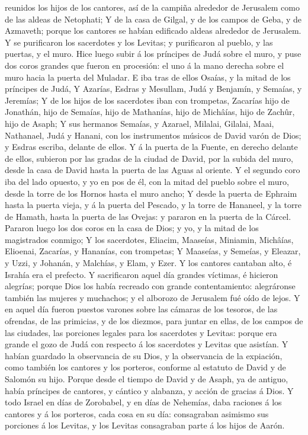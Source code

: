 reunidos los hijos de los cantores, así de la campiña alrededor de
Jerusalem como de las aldeas de Netophati;  Y de la casa
de Gilgal, y de los campos de Geba, y de Azmaveth; porque los cantores
se habían edificado aldeas alrededor de Jerusalem.  Y se
purificaron los sacerdotes y los Levitas; y purificaron al pueblo, y las
puertas, y el muro.  Hice luego subir á los príncipes de
Judá sobre el muro, y puse dos coros grandes que fueron en procesión: el
uno á la mano derecha sobre el muro hacia la puerta del Muladar.
 E iba tras de ellos Osaías, y la mitad de los príncipes
de Judá,  Y Azarías, Esdras y Mesullam, 
Judá y Benjamín, y Semaías, y Jeremías;  Y de los hijos
de los sacerdotes iban con trompetas, Zacarías hijo de Jonathán, hijo de
Semaías, hijo de Mathanías, hijo de Michâías, hijo de Zachûr, hijo de
Asaph;  Y sus hermanos Semaías, y Azarael, Milalai,
Gilalai, Maai, Nathanael, Judá y Hanani, con los instrumentos músicos de
David varón de Dios; y Esdras escriba, delante de ellos. 
Y á la puerta de la Fuente, en derecho delante de ellos, subieron por
las gradas de la ciudad de David, por la subida del muro, desde la casa
de David hasta la puerta de las Aguas al oriente.  Y el
segundo coro iba del lado opuesto, y yo en pos de él, con la mitad del
pueblo sobre el muro, desde la torre de los Hornos hasta el muro ancho;
 Y desde la puerta de Ephraim hasta la puerta vieja, y á
la puerta del Pescado, y la torre de Hananeel, y la torre de Hamath,
hasta la puerta de las Ovejas: y pararon en la puerta de la Cárcel.
 Pararon luego los dos coros en la casa de Dios; y yo, y
la mitad de los magistrados conmigo;  Y los sacerdotes,
Eliacim, Maaseías, Miniamin, Michâías, Elioenai, Zacarías, y Hananías,
con trompetas;  Y Maaseías, y Semeías, y Eleazar, y Uzzi,
y Johanán, y Malchías, y Elam, y Ezer. Y los cantores cantaban alto, é
Israhía era el prefecto.  Y sacrificaron aquel día
grandes víctimas, é hicieron alegrías; porque Dios los había recreado
con grande contentamiento: alegráronse también las mujeres y muchachos;
y el alborozo de Jerusalem fué oído de lejos.  Y en aquel
día fueron puestos varones sobre las cámaras de los tesoros, de las
ofrendas, de las primicias, y de los diezmos, para juntar en ellas, de
los campos de las ciudades, las porciones legales para los sacerdotes y
Levitas: porque era grande el gozo de Judá con respecto á los sacerdotes
y Levitas que asistían.  Y habían guardado la observancia
de su Dios, y la observancia de la expiación, como también los cantores
y los porteros, conforme al estatuto de David y de Salomón su hijo.
 Porque desde el tiempo de David y de Asaph, ya de
antiguo, había príncipes de cantores, y cántico y alabanza, y acción de
gracias á Dios.  Y todo Israel en días de Zorobabel, y en
días de Nehemías, daba raciones á los cantores y á los porteros, cada
cosa en su día: consagraban asimismo sus porciones á los Levitas, y los
Levitas consagraban parte á los hijos de Aarón.

